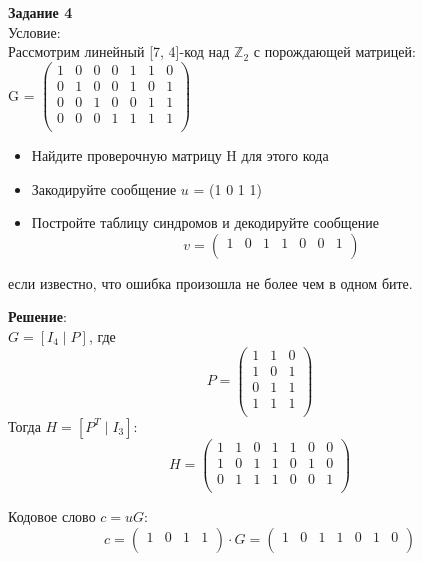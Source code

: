 \documentclass[12pt]{article}
\begin{document}
\newpage


\begin{flushleft}
    \textbf{Задание 4} \\
    Условие: \\
    Рассмотрим линейный [7, 4]-код над $\mathbb{Z}_2$ с порождающей матрицей: \\
    G = 
    $\begin{pmatrix}
        1 & 0 & 0 & 0 & 1 & 1 & 0 \\
        0 & 1 & 0 & 0 & 1 & 0 & 1 \\
        0 & 0 & 1 & 0 & 0 & 1 & 1 \\
        0 & 0 & 0 & 1 & 1 & 1 & 1 \\
    \end{pmatrix}$ \\
    \begin{itemize}
        \item Найдите проверочную матрицу H для этого кода
        \item Закодируйте сообщение $u$ = (1 0 1 1)
        \item Постройте таблицу синдромов и декодируйте сообщение
            \[ v = \begin{pmatrix}
                1 & 0 & 1 & 1 & 0 & 0 & 1 \\
            \end{pmatrix} \]
    \end{itemize}
    если известно, что ошибка произошла не более чем в одном бите.

    \vspace{20pt}
    \textbf{Решение}: \\
    $G = [I_4 \; | \; P] $, где \\ \[P =
    \begin{pmatrix}
        1 & 1 & 0 \\
        1 & 0 & 1 \\
        0 & 1 & 1 \\
        1 & 1 & 1 \\
    \end{pmatrix} \]
    Тогда $H = [P^T \; | \; I_3]$:
    \[ H =
    \begin{pmatrix}
        1 & 1 & 0 & 1 & 1 & 0 & 0 \\
        1 & 0 & 1 & 1 & 0 & 1 & 0 \\
        0 & 1 & 1 & 1 & 0 & 0 & 1 \\
    \end{pmatrix} \]

    Кодовое слово $c = uG$:
    \[ c = \begin{pmatrix}
        1 & 0 & 1 & 1 \\
    \end{pmatrix} \cdot G =  \begin{pmatrix}
        1 & 0 & 1 & 1 & 0 & 1 & 0 \\
    \end{pmatrix} \]


\end{flushleft}
\end{document}
